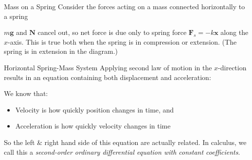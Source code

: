 \documentclass[12pt,compress,aspectratio=169]{beamer}
\begin{document}
\begin{frame}{Mass on a Spring}
  Consider the forces acting on a mass connected horizontally to a spring

  \begin{center}
  \end{center}

  \vspace{-.1in}$m\bm{g}$ and $\bm{N}$ cancel out, so net force is due only to
  spring force $\bm{F}_s=-k\bm{x}$ along the $x$-axis. This is true both when
  the spring is in compression or extension. (The spring is in extension in the
  diagram.)
\end{frame}



\begin{frame}{Horizontal Spring-Mass System}
  Applying second law of motion in the $x$-direction results in an equation
  containing both displacement and acceleration:


  We know that:
  \begin{itemize}
  \item Velocity is how quickly position changes in time, and
  \item Acceleration is how quickly velocity changes in time
  \end{itemize}
  So the left \& right hand side of this equation are actually related. In
  calculus, we call this a
  \emph{second-order ordinary differential equation with constant coefficients}.
\end{frame}
\end{document}

